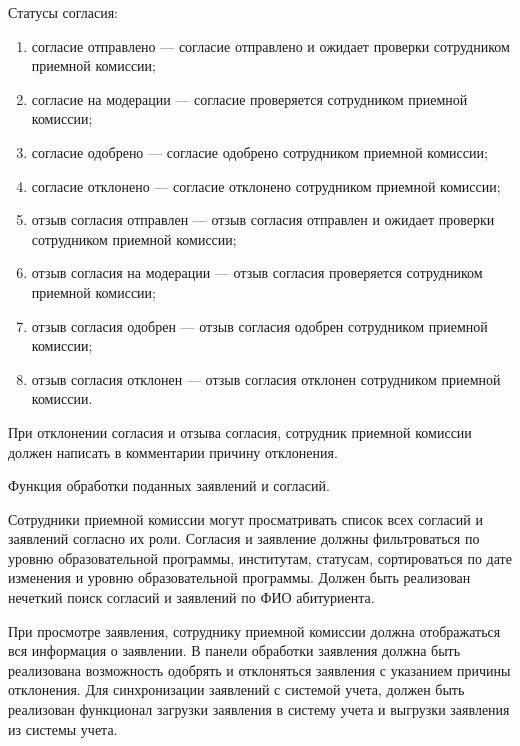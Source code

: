 Статусы согласия:

\begin{enumerate} 
  \item согласие отправлено — согласие отправлено и ожидает проверки сотрудником приемной комиссии;
  
  \item согласие на модерации — согласие проверяется сотрудником приемной комиссии;
  
  \item согласие одобрено — согласие одобрено сотрудником приемной комиссии;
  
  \item согласие отклонено — согласие отклонено сотрудником приемной комиссии;
  
  \item отзыв согласия отправлен — отзыв согласия отправлен и ожидает проверки сотрудником приемной комиссии;
  
  \item отзыв согласия на модерации — отзыв согласия проверяется сотрудником приемной комиссии;
  
  \item отзыв согласия одобрен — отзыв согласия одобрен сотрудником приемной комиссии;
  
  \item отзыв согласия отклонен — отзыв согласия отклонен сотрудником приемной комиссии.
\end{enumerate}

При отклонении согласия и отзыва согласия, сотрудник приемной комиссии должен написать в комментарии причину отклонения.

Функция обработки поданных заявлений и согласий.

Сотрудники приемной комиссии могут просматривать список всех согласий и заявлений согласно их роли. Согласия и заявление должны фильтроваться по уровню образовательной программы, институтам, статусам, сортироваться по дате изменения и уровню образовательной программы. Должен быть реализован нечеткий поиск согласий и заявлений по ФИО абитуриента.

При просмотре заявления, сотруднику приемной комиссии должна отображаться вся информация о заявлении. В панели обработки заявления должна быть реализована возможность одобрять и отклоняться заявления с указанием причины отклонения. Для синхронизации заявлений с системой учета, должен быть реализован функционал загрузки заявления в систему учета и выгрузки заявления из системы учета.

